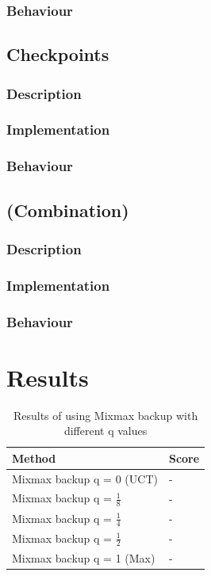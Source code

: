 \documentclass[10pt,a4paper]{article}
\begin{document}
\subsubsection{Behaviour}
\subsection{Checkpoints}
\subsubsection{Description}
\subsubsection{Implementation}
\subsubsection{Behaviour}
\subsection{(Combination)}
\subsubsection{Description}
\subsubsection{Implementation}
\subsubsection{Behaviour}

\clearpage

\section{Results}
\renewcommand{\arraystretch}{1.5}
\begin{table}[h]
	\centering
	\begin{tabular}{| l | l |}
		\hline
		\textbf{Method} & \textbf{Score} 		\\ \hline
		Mixmax backup q = 0 (UCT) 			& - \\ \hline
		Mixmax backup q = $\frac{1}{8}$	& - \\ \hline
		Mixmax backup q = $\frac{1}{4}$	& - \\ \hline
		Mixmax backup q = $\frac{1}{2}$	& - \\ \hline
		Mixmax backup q = 1 (Max)			& - \\ \hline
	\end{tabular}
	\caption{Results of using Mixmax backup with different q values}
	\label{tab:mixmax_results}
\end{table}
\end{document}
